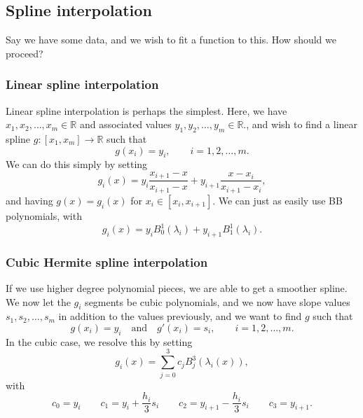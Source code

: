 \subsection{Spline interpolation}
Say we have some data, and we wish to fit a function to this.
How should we proceed?

\subsubsection{Linear spline interpolation}
Linear spline interpolation is perhaps the simplest.
Here, we have $x_1, x_2, \dots, x_m \in \mathbb{R}$ and associated values $y_1, y_2, \dots, y_m \in \mathbb{R}$., and wish to find a linear spline $g : [x_1, x_m] \to \mathbb{R}$ such that
\begin{equation}
    g(x_i) = y_i, \qquad i = 1, 2, \dots, m.
\end{equation}
We can do this simply by setting
\begin{equation}
    g_i(x) = y_i \frac{x_{i + 1} - x}{x_{i + 1} - x} + y_{i + 1} \frac{x - x_i}{x_{i + 1} - x_i},
\end{equation}
and having $g(x) = g_i(x)$ for $x_i \in [x_i, x_{i + 1}]$.
We can just as easily use BB polynomials, with
\begin{equation}
    g_i(x) = y_i B_0^1(\lambda_i) + y_{i + 1} B_1^1(\lambda_i).
\end{equation}

\subsubsection{Cubic Hermite spline interpolation}
If we use higher degree polynomial pieces, we are able to get a smoother spline.
We now let the $g_i$ segments be cubic polynomials, and we now have slope values $s_1, s_2, \dots, s_m$ in addition to the values previously, and we want to find $g$ such that
\begin{equation}
    g(x_i) = y_i
    \quad\text{and}\quad
    g'(x_i) = s_i,
    \qquad i = 1, 2, \dots, m.
\end{equation}
In the cubic case, we resolve this by setting
\begin{equation}
    g_i(x) = \sum_{j = 0}^{3} c_j B_j^3(\lambda_i(x)),
\end{equation}
with
\begin{equation}
    c_0 = y_i
    \qquad
    c_1 = y_i + \frac{h_i}{3} s_i
    \qquad
    c_2 = y_{i + 1} - \frac{h_i}{3} s_i
    \qquad
    c_3 = y_{i + 1}.
\end{equation}

